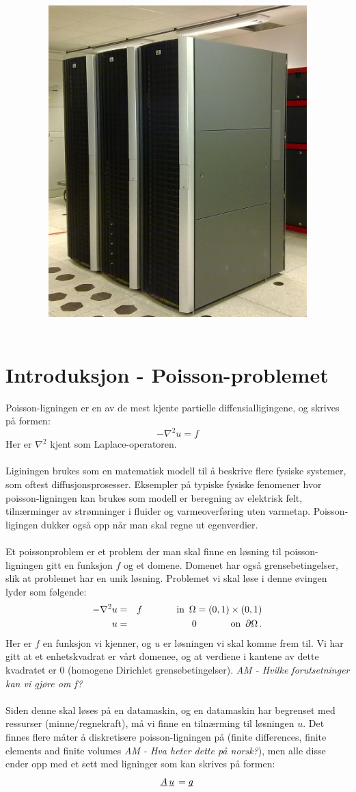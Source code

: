 \documentclass{article}
\title{
\vspace*{\stretch{1}}
\noindent\HRule
\begin{center}
 \Huge
 \noindent	\exerciseClass \\
 \noindent \exerciseTitle \\ [4mm]
 \large
 \noindent\emph{\exerciseGroupMembers}
\noindent\HRule \newline
\end{center}
\vspace{0cm}
\begin{center}
	\includegraphics[width=10cm]{img/kongull.jpg}
\end{center}
\vspace*{\stretch{3}}
\begin{center}
\end{center}
}
\newcommand{\ub}[1]{\underbar{$#1$}\,}
\begin{document}
\pagestyle{empty}
\maketitle

\thispagestyle{empty}

\newpage \tableofcontents


\newpage


\section{Introduksjon - Poisson-problemet}
Poisson-ligningen er en av de mest kjente partielle diffensialligingene, og skrives på formen:
\begin{equation}
	-\nabla^2 u = f
\end{equation}
Her er $\nabla^2$ kjent som Laplace-operatoren.\\
\\
Liginingen brukes som en matematisk modell til å beskrive flere fysiske systemer, som oftest diffusjonsprosesser. Eksempler på typiske fysiske fenomener hvor poisson-ligningen kan brukes som modell er beregning av elektrisk felt, tilnærminger av strømninger i fluider og varmeoverføring uten varmetap. Poisson-ligingen dukker også opp når man skal regne ut egenverdier.\\
\\
Et poissonproblem er et problem der man skal finne en løsning til poisson-ligningen gitt en funksjon $f$ og et domene. Domenet har også grensebetingelser, slik at problemet har en unik løsning. Problemet vi skal løse i denne øvingen lyder som følgende:
\begin{eqnarray}
	-\nabla^2 u & = & f \hspace{.5in} \textrm{in} \,\,\, \Omega = (0,1)\times (0,1) \\
	u & = & 0 \hspace{.5in} \textrm{on} \,\,\, \partial\Omega\, .
\end{eqnarray}
Her er $f$ en funksjon vi kjenner,  og $u$ er løsningen vi skal komme frem til. Vi har gitt at et enhetskvadrat  er vårt domenee, og at verdiene i kantene av dette kvadratet er $0$ (homogene Dirichlet grensebetingelser). \emph{AM - Hvilke forutsetninger kan vi gjøre om f?}\\
\\
Siden denne skal løses på en datamaskin, og en datamaskin har begrenset med ressurser (minne/regnekraft), må vi finne en tilnærming til løsningen $u$. Det finnes flere måter å diskretisere poisson-ligningen på (finite differences, finite elements and finite volumes \emph{AM - Hva heter dette på norsk?}), men alle disse ender opp med et sett med ligninger som kan skrives på formen:
\begin{equation}
	\label{eq:linear-system}
  \ub{A} \ub{u} = \ub{g}
\end{equation}
\end{document}

